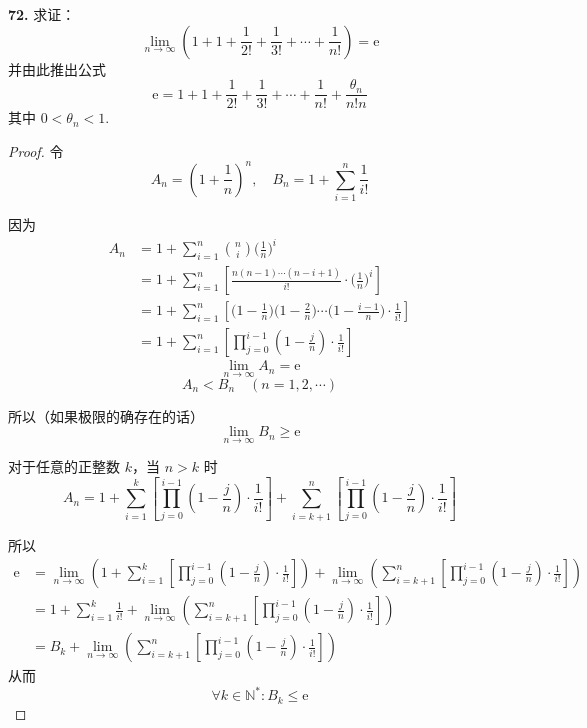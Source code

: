 \textbf{72.} 求证：
\[\lim_{n \rightarrow \infty} \left(1 + 1 + \frac{1}{2!} + \frac{1}{3!} + \cdots + \frac{1}{n!}\right) = \mathrm{e} \tag{72.1}\]
并由此推出公式
\[\mathrm{e} = 1 + 1 + \frac{1}{2!} + \frac{1}{3!} + \cdots + \frac{1}{n!} + \frac{\theta_n}{n!n} \tag{72.2}\]
其中 $0 < \theta_n < 1$.
\begin{proof}
    令
    \[A_n = \left(1 + \frac{1}{n}\right)^n, \quad B_n = 1 + \sum_{i=1}^{n} \frac{1}{i!} \tag{72.3}\]

    因为
    \begin{align*}
        A_n &= 1 + \sum_{i=1}^{n} {n \choose i} \biggl(\frac{1}{n}\biggr)^i\\
        &= 1 + \sum_{i=1}^{n} \left[\frac{n(n-1)\cdots (n-i+1)}{i!} \cdot \biggl(\frac{1}{n}\biggr)^i\right]\\
        &= 1 + \sum_{i=1}^{n} \left[\biggl(1 - \frac{1}{n}\biggr)\biggl(1 - \frac{2}{n}\biggr) \cdots \biggl(1 - \frac{i-1}{n}\biggr) \cdot \frac{1}{i!}\right]\\
        &= 1 + \sum_{i=1}^{n} \left[\prod_{j=0}^{i-1} \left(1 - \frac{j}{n}\right) \cdot \frac{1}{i!}\right]
    \end{align*}
    \[\lim_{n \rightarrow \infty}A_n = \mathrm{e}\]
    \[A_n < B_n \quad (n=1,2,\cdots)\]

    所以（如果极限的确存在的话）
    \[\lim_{n \rightarrow \infty}B_n \geqslant \mathrm{e} \tag{72.4}\]

    对于任意的正整数 $k$，当 $n > k$ 时
    \[A_n = 1 + \sum_{i=1}^{k}\left[\prod_{j=0}^{i-1}\left(1 - \frac{j}{n}\right) \cdot \frac{1}{i!}\right] + \sum_{i=k+1}^{n}\left[\prod_{j=0}^{i-1}\left(1 - \frac{j}{n}\right) \cdot \frac{1}{i!}\right]\]

    所以
    \begin{align*}
        \mathrm{e} &= \lim_{n \rightarrow \infty} \left(1 + \sum_{i=1}^{k}\left[\prod_{j=0}^{i-1}\left(1 - \frac{j}{n}\right) \cdot \frac{1}{i!}\right]\right) + \lim_{n \rightarrow \infty}\left(\sum_{i=k+1}^{n}\left[\prod_{j=0}^{i-1}\left(1 - \frac{j}{n}\right) \cdot \frac{1}{i!}\right]\right)\\
        &= 1 + \sum_{i=1}^{k}\frac{1}{i!} + \lim_{n \rightarrow \infty}\left(\sum_{i=k+1}^{n}\left[\prod_{j=0}^{i-1}\left(1 - \frac{j}{n}\right) \cdot \frac{1}{i!}\right]\right)\\
        &= B_k + \lim_{n \rightarrow \infty}\left(\sum_{i=k+1}^{n}\left[\prod_{j=0}^{i-1}\left(1 - \frac{j}{n}\right) \cdot \frac{1}{i!}\right]\right)
    \end{align*}
    从而
    \[\forall k \in \mathbb{N}^*: B_k \leqslant \mathrm{e} \tag{72.5}\]


\end{proof}
